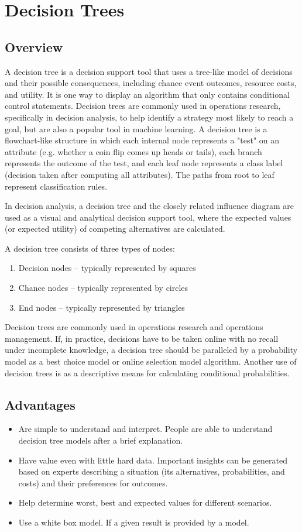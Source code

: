 \documentclass[12pt, a4paper]{report}
\begin{document}
\section{Decision Trees}
\subsection{Overview}
A decision tree is a decision support tool that uses a tree-like model of decisions and their possible consequences, including chance event outcomes, resource costs, and utility. It is one way to display an algorithm that only contains conditional control statements. Decision trees are commonly used in operations research, specifically in decision analysis, to help identify a strategy most likely to reach a goal, but are also a popular tool in machine learning.
A decision tree is a flowchart-like structure in which each internal node represents a "test" on an attribute (e.g. whether a coin flip comes up heads or tails), each branch represents the outcome of the test, and each leaf node represents a class label (decision taken after computing all attributes). The paths from root to leaf represent classification rules.

In decision analysis, a decision tree and the closely related influence diagram are used as a visual and analytical decision support tool, where the expected values (or expected utility) of competing alternatives are calculated.

A decision tree consists of three types of nodes:
\begin{enumerate}
\item Decision nodes – typically represented by squares
\item Chance nodes – typically represented by circles
\item End nodes – typically represented by triangles
\end{enumerate}
Decision trees are commonly used in operations research and operations management. If, in practice, decisions have to be taken online with no recall under incomplete knowledge, a decision tree should be paralleled by a probability model as a best choice model or online selection model algorithm. Another use of decision trees is as a descriptive means for calculating conditional probabilities.

\subsection{Advantages}
\begin{itemize}
\item Are simple to understand and interpret. People are able to understand decision tree models after a brief explanation.
\item Have value even with little hard data. Important insights can be generated based on experts describing a situation (its alternatives, probabilities, and costs) and their preferences for outcomes.
\item Help determine worst, best and expected values for different scenarios.
\item Use a white box model. If a given result is provided by a model.
\end{itemize}
\end{document}
